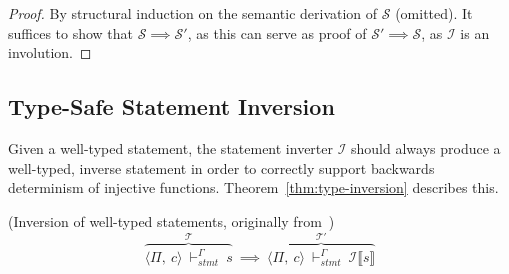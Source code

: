 \begin{proof}\let\qed\relax
    By structural induction on the semantic derivation of $\mathcal{S}$ (omitted). It suffices to show that $\mathcal{S} \implies \mathcal{S}'$, as this can serve as proof of $\mathcal{S}' \implies \mathcal{S}$, as $\mathcal{I}$ is an involution.
\end{proof}    

\subsection{Type-Safe Statement Inversion}
\label{subsec:type-safe-statement-inversion}
Given a well-typed statement, the statement inverter $\mathcal{I}$ should always produce a well-typed, inverse statement in order to correctly support backwards determinism of injective functions. Theorem~\ref{thm:type-inversion} describes this.

\begin{theorem}\label{thm:type-inversion}(Inversion of well-typed statements, originally from~\cite{th:roopl})
    \begin{equation*}
        \overbrace{\langle \Pi,\ c\rangle\ \vdash_{stmt}^\Gamma\ s}^{\mathcal{T}}\ \implies\ \overbrace{\langle \Pi,\ c\rangle\ \vdash_{stmt}^\Gamma\ \mathcal{I}\llbracket s\rrbracket}^{\mathcal{T}'}
    \end{equation*}
\end{theorem}

